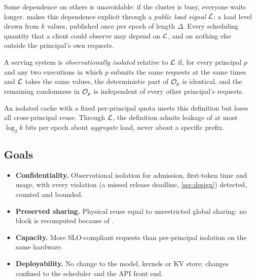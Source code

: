 Some dependence on others is unavoidable: if the cluster is busy, everyone
waits longer. \sys makes this dependence explicit through a \emph{public load
signal} $\mathcal{L}$: a load level drawn from $k$ values, published once per epoch of
length $\Delta$. Every scheduling quantity that a client could observe may depend
on $\mathcal{L}$, and on nothing else outside the principal's own requests.

\begin{definition}
\label{def:oi}
A serving system is \emph{observationally isolated} relative to $\mathcal{L}$ if, for
every principal $p$ and any two executions in which $p$ submits the same
requests at the same times and $\mathcal{L}$ takes the same values, the deterministic
part of $\mathcal{O}_p$ is identical, and the remaining randomness in $\mathcal{O}_p$ is
independent of every other principal's requests.
\end{definition}

An isolated cache with a fixed per-principal quota meets this definition but
loses all cross-principal reuse. Through $\mathcal{L}$, the definition admits leakage
of at most $\log_2 k$ bits per epoch about \emph{aggregate} load, never about a
specific prefix.

\subsection{Goals}
\begin{itemize}
\item[\textbf{G1}] \textbf{Confidentiality.} Observational isolation for
  admission, first-token time and usage, with every violation (a missed release
  deadline, \cref{sec:design}) detected, counted and bounded.
\item[\textbf{G2}] \textbf{Preserved sharing.} Physical reuse equal to
  unrestricted global sharing: no block is recomputed because of \sys.
\item[\textbf{G3}] \textbf{Capacity.} More SLO-compliant requests than
  per-principal isolation on the same hardware.
\item[\textbf{G4}] \textbf{Deployability.} No change to the model, kernels or
  KV store; changes confined to the scheduler and the API front end.
\end{itemize}
